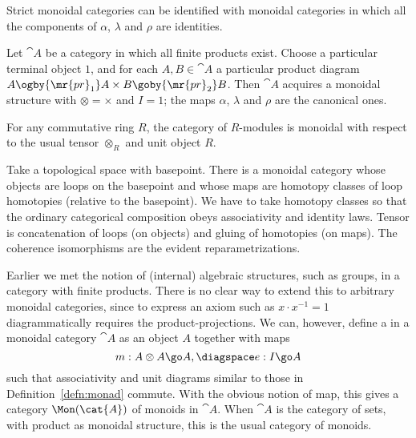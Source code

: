 \begin{example}
Strict monoidal categories can be identified with monoidal categories in
which all the components of $\alpha$, $\lambda$ and $\rho$ are identities.
\end{example}

\begin{example}
Let $\cat{A}$ be a category in which all finite%
%
%
products exist.
Choose a particular terminal object $1$, and for each $A, B \in
\cat{A}$ a particular product diagram $A \ogby{\mr{pr}_1} A\times B
\goby{\mr{pr}_2} B$.%
% 
%
 Then $\cat{A}$ acquires a monoidal structure
with $\otimes = \times$ and $I = 1$; the maps $\alpha$, $\lambda$ and
$\rho$ are the canonical ones.
\end{example}

\begin{example}
For any commutative ring $R$, the category of $R$-modules%
%
%
is monoidal with respect to the usual tensor $\otimes_R$ and unit object
$R$.
\end{example}

\begin{example}	
Take a topological space with basepoint.  There is a monoidal category
whose objects are loops%
%
%
on the basepoint and whose maps are homotopy classes of loop homotopies
(relative to the basepoint).  We have to take homotopy classes so that the
ordinary categorical composition obeys associativity and identity laws.
Tensor is concatenation of loops (on objects) and gluing of homotopies (on
maps).  The coherence isomorphisms are the evident reparametrizations.
\end{example}

Earlier we met the notion of (internal) algebraic structures, such as
groups, in a category with finite products.  There is no clear way to
extend this to arbitrary monoidal categories, since to express an axiom
such as $x \cdot x^{-1} = 1$ diagrammatically requires the
product-projections.  We can, however, define a %
%
%
in a
monoidal category $\cat{A}$ as an object $A$ together with maps
\[
m: A \otimes A \go A,
\diagspace
e: I \go A
\]
such that associativity and unit diagrams similar to those in
Definition~\ref{defn:monad} commute.  With the obvious notion of map, this
gives a category $\Mon(\cat{A})$%
% 
%
of monoids in $\cat{A}$.  When $\cat{A}$
is the category of sets, with product as monoidal structure, this is the
usual category of monoids.

